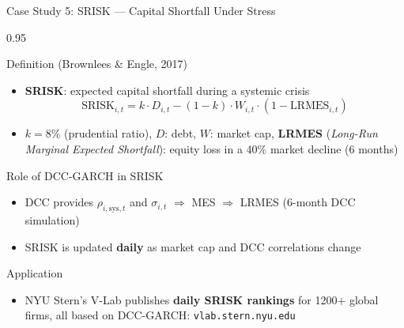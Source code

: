 \documentclass[9pt, aspectratio=169, t]{beamer}
\begin{document}
\begin{frame}{Case Study 5: SRISK --- Capital Shortfall Under Stress}
    \begin{cminipage}{0.95\textwidth}
    \vspace{-2mm}
    {\scriptsize
    \begin{block}{Definition (Brownlees \& Engle, 2017)}
        \begin{itemize}\setlength{\itemsep}{0pt}
            \item \textbf{SRISK}: expected capital shortfall during a systemic crisis
            \vspace{-1mm}
            \[
                \text{SRISK}_{i,t} = k \cdot D_{i,t} - (1-k) \cdot W_{i,t} \cdot (1 - \text{LRMES}_{i,t})
            \]
            \vspace{-4mm}
            \item $k = 8\%$ (prudential ratio), $D$: debt, $W$: market cap, \textbf{LRMES} (\textit{Long-Run Marginal Expected Shortfall}): equity loss in a 40\% market decline (6 months)
        \end{itemize}
    \end{block}
    \vspace{-2mm}
    \begin{block}{Role of DCC-GARCH in SRISK}
        \begin{itemize}\setlength{\itemsep}{0pt}
            \item DCC provides $\rho_{i,\text{sys},t}$ and $\sigma_{i,t}$ $\Rightarrow$ MES $\Rightarrow$ LRMES (6-month DCC simulation)
            \item SRISK is updated \textbf{daily} as market cap and DCC correlations change
        \end{itemize}
    \end{block}
    \vspace{-2mm}
    \begin{alertblock}{Application}
        \begin{itemize}\setlength{\itemsep}{0pt}
            \item NYU Stern's V-Lab publishes \textbf{daily SRISK rankings} for 1200+ global firms, all based on DCC-GARCH: \texttt{vlab.stern.nyu.edu}
        \end{itemize}
    \end{alertblock}
    }
    \end{cminipage}
\end{frame}
\end{document}

